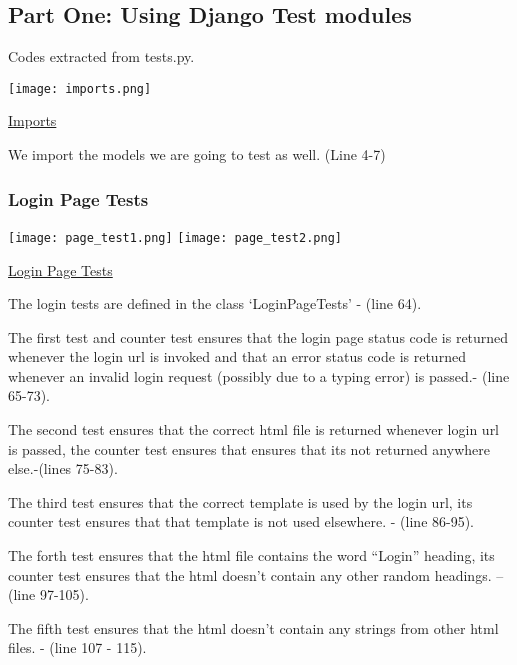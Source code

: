 \documentclass[10pt]{article}
\begin{document}
\subsection{Part One:  Using Django Test modules}

Codes extracted from tests.py.

\begin{center}
\texttt{[image: imports.png]}
\end{center}
\caption{\underline{Imports}}
We import the models we are going to test as well. (Line 4-7)

\subsubsection{Login Page Tests}

\begin{center}
\texttt{[image: page\_test1.png]}
\texttt{[image: page\_test2.png]}
\end{center}
\caption{\underline{Login Page Tests}}

\begin{description}[font=$\bullet$~\normalfont\scshape\color{red!50!black}]

\item [] The login tests are defined in the class ‘LoginPageTests’ - (line 64).
\item [] The first test and counter test ensures that the login page status code is returned whenever the login url is invoked and that an error status  code is returned whenever an invalid login request (possibly due to a typing error) is passed.- (line 65-73).
\item [] The second test ensures that the correct html file is returned whenever login url is passed, the counter test ensures that ensures that its not returned anywhere else.-(lines 75-83).
\item [] The third test ensures that the correct template is used by the login url, its counter test ensures that that template is not used elsewhere. - (line 86-95).
\item [] The forth test ensures that the html file contains the word “Login” heading, its counter test ensures that the html doesn’t contain any other random headings. – (line 97-105).
\item [] The fifth test ensures that the html doesn’t contain any strings from other html files. - (line 107 - 115).

\end{description}
\end{document}
